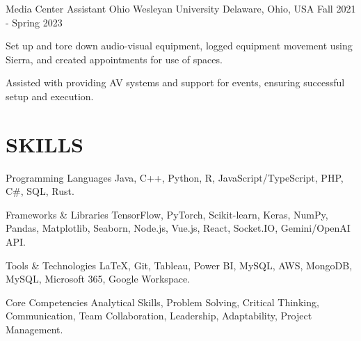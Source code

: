 \documentclass[10pt, letterpaper]{article}
\begin{document}
\begin{experienceentry}
  {Media Center Assistant} %
  {Ohio Wesleyan University} %
  {Delaware, Ohio, USA} %
  {Fall 2021 - Spring 2023} %
  \item Set up and tore down audio-visual equipment, logged equipment movement using Sierra, and created appointments for use of spaces.
  \item Assisted with providing AV systems and support for events, ensuring successful setup and execution.
\end{experienceentry}

\vspace{\headerSpacing}

\section{SKILLS}

\begin{skillcategory}{Programming Languages}
  Java, C++, Python, R, JavaScript/TypeScript, PHP, C\#, SQL, Rust.
\end{skillcategory}

\begin{skillcategory}{Frameworks \& Libraries}
  TensorFlow, PyTorch, Scikit-learn, Keras, NumPy, Pandas, Matplotlib, Seaborn, Node.js, Vue.js, React, Socket.IO, Gemini/OpenAI API.
\end{skillcategory}

\begin{skillcategory}{Tools \& Technologies}
  \LaTeX, Git, Tableau, Power BI, MySQL, AWS, MongoDB, MySQL, Microsoft 365, Google Workspace.
\end{skillcategory}

\begin{skillcategory}{Core Competencies}
  Analytical Skills, Problem Solving, Critical Thinking, Communication, Team Collaboration, Leadership, Adaptability, Project Management.
\end{skillcategory}
\end{document}
